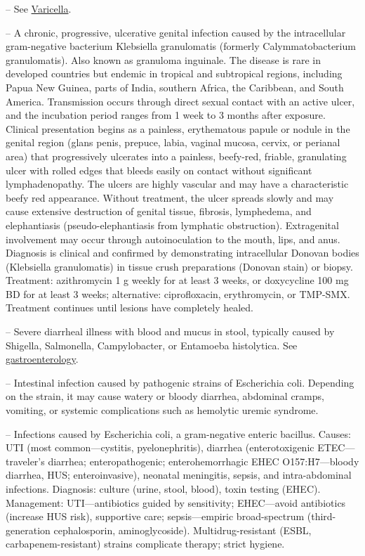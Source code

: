 -- See \hyperlink{Varicella}{Varicella}.

-- A chronic, progressive, ulcerative genital infection caused by the intracellular gram-negative bacterium Klebsiella granulomatis (formerly Calymmatobacterium granulomatis). Also known as granuloma inguinale. The disease is rare in developed countries but endemic in tropical and subtropical regions, including Papua New Guinea, parts of India, southern Africa, the Caribbean, and South America. Transmission occurs through direct sexual contact with an active ulcer, and the incubation period ranges from 1 week to 3 months after exposure. Clinical presentation begins as a painless, erythematous papule or nodule in the genital region (glans penis, prepuce, labia, vaginal mucosa, cervix, or perianal area) that progressively ulcerates into a painless, beefy-red, friable, granulating ulcer with rolled edges that bleeds easily on contact without significant lymphadenopathy. The ulcers are highly vascular and may have a characteristic beefy red appearance. Without treatment, the ulcer spreads slowly and may cause extensive destruction of genital tissue, fibrosis, lymphedema, and elephantiasis (pseudo-elephantiasis from lymphatic obstruction). Extragenital involvement may occur through autoinoculation to the mouth, lips, and anus. Diagnosis is clinical and confirmed by demonstrating intracellular Donovan bodies (Klebsiella granulomatis) in tissue crush preparations (Donovan stain) or biopsy. Treatment: azithromycin 1 g weekly for at least 3 weeks, or doxycycline 100 mg BD for at least 3 weeks; alternative: ciprofloxacin, erythromycin, or TMP-SMX. Treatment continues until lesions have completely healed.

-- Severe diarrheal illness with blood and mucus in stool, typically caused by Shigella, Salmonella, Campylobacter, or Entamoeba histolytica. See \hyperlink{Gastroenterology}{gastroenterology}.

-- Intestinal infection caused by pathogenic strains of Escherichia coli. Depending on the strain, it may cause watery or bloody diarrhea, abdominal cramps, vomiting, or systemic complications such as hemolytic uremic syndrome.

-- Infections caused by Escherichia coli, a gram-negative enteric bacillus. Causes: UTI (most common—cystitis, pyelonephritis), diarrhea (enterotoxigenic ETEC—traveler's diarrhea; enteropathogenic; enterohemorrhagic EHEC O157:H7—bloody diarrhea, HUS; enteroinvasive), neonatal meningitis, sepsis, and intra-abdominal infections. Diagnosis: culture (urine, stool, blood), toxin testing (EHEC). Management: UTI—antibiotics guided by sensitivity; EHEC—avoid antibiotics (increase HUS risk), supportive care; sepsis—empiric broad-spectrum (third-generation cephalosporin, aminoglycoside). Multidrug-resistant (ESBL, carbapenem-resistant) strains complicate therapy; strict hygiene.

